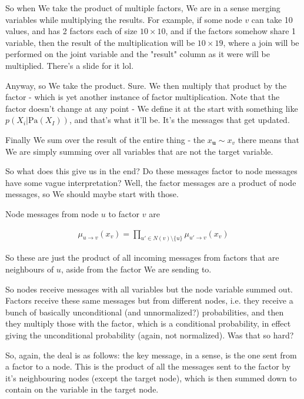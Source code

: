 \documentclass{article}
\begin{document}
		So when We take the product of multiple factors, We are in a sense merging variables while multiplying the results. For example, if some node $v$ can take 10 values, and has 2 factors each of size $10\times 10$, and if the factors somehow share 1 variable, then the result of the multiplication will be $10\times 19$, where a join will be performed on the joint variable and the "result" column as it were will be multiplied. There's a slide for it lol.
		
		Anyway, so We take the product. Sure. We then multiply that product by the factor - which is yet another instance of factor multiplication. Note that the factor doesn't change at any point - We define it at the start with something like $p(X_i|\text{Pa}(X_I))$, and that's what it'll be. It's the messages that get updated.
		
		Finally We sum over the result of the entire thing - the $x_{\mathbf{u}}\sim x_v$ there means that We are simply summing over all variables that are not the target variable.
		
		So what does this give us in the end? Do these messages factor to node messages have some vague interpretation? Well, the factor messages are a product of node messages, so We should maybe start with those.
		
		Node messages from node $u$ to factor $v$ are
		
		\begin{align}
			\mu_{u\to v}(x_v) = \prod_{u'\in N(v)\setminus \{u \}} \mu_{u'\to v}(x_v)
		\end{align}
		
		So these are just the product of all incoming messages from factors that are neighbours of $u$, aside from the factor We are sending to.
		
		So nodes receive messages with all variables but the node variable summed out. Factors receive these same messages but from different nodes, i.e. they receive a bunch of basically unconditional (and unnormalized?) probabilities, and then they multiply those with the factor, which is a conditional probability, in effect giving the unconditional probability (again, not normalized). Was that so hard?
		
		So, again, the deal is as follows: the key message, in a sense, is the one sent from a factor to a node. This is the product of all the messages sent to the factor by it's neighbouring nodes (except the target node), which is then summed down to contain on the variable in the target node. 
		
\end{document}
